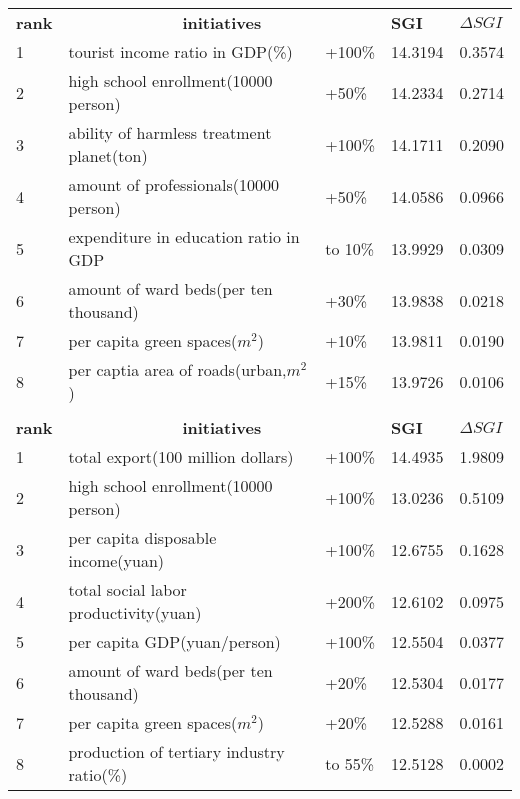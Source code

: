 \documentclass{mcmthesis}
\begin{document}
\begin{table}[h]
\setlength{\abovecaptionskip}{0pt}
\setlength{\belowcaptionskip}{0pt}
\begin{tabular}{p{1cm}|p{7cm}|p{1.3cm}|p{1.4cm}|p{1.4cm}}
\hline
\hline
\rowcolor[gray]{0.9}\multicolumn{5}{c}{Columbia}\\
\hline
\bf rank & \multicolumn{2}{|c|}{ \bf  initiatives} & \bf SGI	&  \bf $\Delta SGI$ \\
\hline
1	& tourist income ratio in GDP(\%)	& +100\%	& 14.3194	& 0.3574 \\
2	& high school enrollment(10000 person)	& +50\%	& 14.2334	& 0.2714 \\
3	& ability of harmless treatment planet(ton)	& +100\%	& 14.1711	& 0.2090 \\
4	& amount of professionals(10000 person)	& +50\%	& 14.0586	& 0.0966 \\
5	& expenditure in education ratio in GDP	& to 10\%	& 13.9929	& 0.0309 \\
6	&  amount of ward beds(per ten thousand)	& +30\%	& 13.9838	& 0.0218 \\
7	& per capita green spaces($m^2$)	& +10\%	& 13.9811	& 0.0190 \\
8	& per captia area of roads(urban,$m^2$)	& +15\%	& 13.9726	& 0.0106 \\
\hline
\hline
\rowcolor[gray]{0.9}\multicolumn{5}{c}{Zhenjiang}\\
\hline
\bf rank & \multicolumn{2}{|c|}{ \bf  initiatives} & \bf SGI	&  \bf $\Delta SGI$ \\
\hline
1	& total export(100 million dollars)	& +100\%	& 14.4935	& 1.9809 \\
2	&  high school enrollment(10000 person)	& +100\%	& 13.0236	& 0.5109 \\
3	& per capita disposable income(yuan)	& +100\%	& 12.6755	& 0.1628 \\
4	& total social labor productivity(yuan)	& +200\%	& 12.6102	& 0.0975 \\
5	&  per capita GDP(yuan/person)	& +100\%	& 12.5504	& 0.0377 \\
6	& amount of ward beds(per ten thousand)	& +20\%	& 12.5304	& 0.0177 \\
7	&  per capita green spaces($m^2$)	& +20\%	& 12.5288	& 0.0161 \\
8	& production of tertiary industry ratio(\%)	& to 55\%	& 12.5128	& 0.0002 \\
\hline
\end{tabular}
\end{table}
\end{document}
